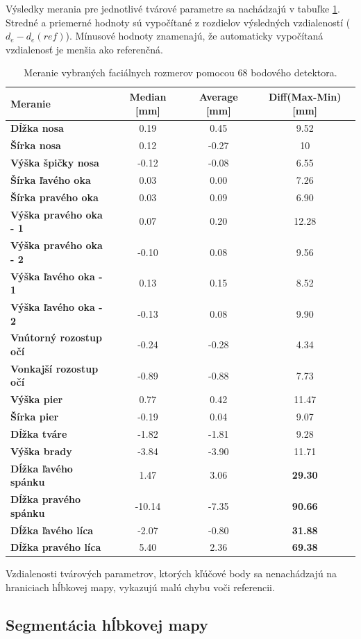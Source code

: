 Výsledky merania pre jednotlivé tvárové parametre sa nachádzajú v tabuľke \ref{tab:dlib:results}. Stredné a priemerné hodnoty sú vypočítané z rozdielov výsledných vzdialeností ($d_e-d_e(ref)$). Mínusové hodnoty znamenajú, že automaticky vypočítaná vzdialenosť je menšia ako referenčná. 

\begin{table}[h]
	\caption{\label{tab:dlib:results} Meranie vybraných faciálnych rozmerov pomocou 68 bodového detektora.}
	\centering
	\begin{tabular}{lccc}
		\toprule
		\textbf{Meranie} & \textbf{Median [mm]} & \textbf{Average [mm]} & \textbf{Diff(Max-Min) [mm]} \\ 
		\midrule
		\textbf{Dĺžka nosa} 			& 0.19 	& 0.45 	& 9.52	\\
		\textbf{Šírka nosa} 			& 0.12	& -0.27 & 10	\\
		\textbf{Výška špičky nosa} 		& -0.12	& -0.08 & 6.55	\\
		\textbf{Šírka ľavého oka} 		& 0.03	& 0.00	& 7.26	\\
		\textbf{Šírka pravého oka} 		& 0.03 	& 0.09	& 6.90	\\
		\textbf{Výška pravého oka - 1} 	& 0.07	& 0.20	& 12.28	\\
		\textbf{Výška pravého oka - 2} 	& -0.10	& 0.08	& 9.56	\\
		\textbf{Výška ľavého oka - 1} 	& 0.13	& 0.15	& 8.52	\\
		\textbf{Výška ľavého oka - 2} 	& -0.13 & 0.08	& 9.90	\\
		\textbf{Vnútorný rozostup očí} 	& -0.24	& -0.28	& 4.34	\\
		\textbf{Vonkajší rozostup očí} 	& -0.89	& -0.88	& 7.73	\\
		\textbf{Výška pier} 			& 0.77	& 0.42	& 11.47	\\
		\textbf{Šírka pier} 			& -0.19 & 0.04	& 9.07	\\
		\textbf{Dĺžka tváre} 			& -1.82	& -1.81	& 9.28	\\
		\textbf{Výška brady} 			& -3.84	& -3.90	& 11.71	\\
		\textbf{Dĺžka ľavého spánku} 	& 1.47	& 3.06	& \textbf{29.30}	\\
		\textbf{Dĺžka pravého spánku} 	& -10.14& -7.35	& \textbf{90.66}	\\
		\textbf{Dĺžka ľavého líca} 		& -2.07	& -0.80	& \textbf{31.88}	\\
		\textbf{Dĺžka pravého líca} 	& 5.40	& 2.36	& \textbf{69.38}	\\
		\bottomrule
	\end{tabular}
\end{table}

Vzdialenosti tvárových parametrov, ktorých kľúčové body sa nenachádzajú na hraniciach hĺbkovej mapy, vykazujú malú chybu voči referencii.  

\subsection{Segmentácia hĺbkovej mapy}